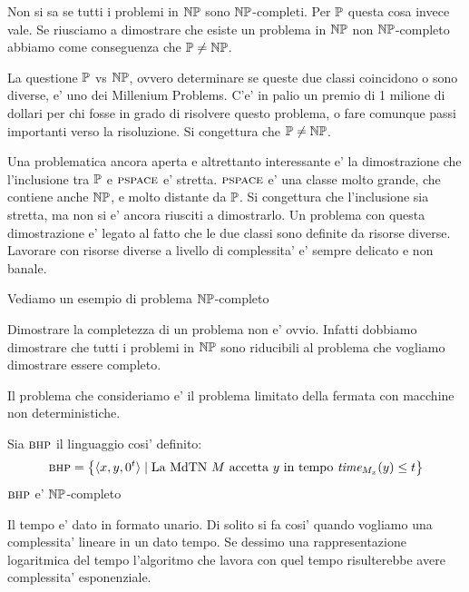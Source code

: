 Non si sa se tutti i problemi in $\mathbb{NP}$ sono $\mathbb{NP}$-completi. Per $\mathbb{P}$ questa cosa
invece vale.  Se riusciamo a dimostrare che esiste un problema in $\mathbb{NP}$ non $\mathbb{NP}$-completo
abbiamo come conseguenza che
$\mathbb{P} \not= \mathbb{NP}$.


La questione $\mathbb{P}$ vs $\mathbb{NP}$, ovvero determinare se queste due classi coincidono o sono
diverse, e' uno dei Millenium Problems. C'e' in palio un premio di 1 milione di dollari per chi
fosse in grado di risolvere questo problema, o fare comunque passi importanti verso la risoluzione.
Si congettura che $\mathbb{P} \not= \mathbb{NP}$.

Una problematica ancora aperta e altrettanto interessante e' la dimostrazione che l'inclusione tra
$\mathbb{P}$ e $\textsc{pspace}$ e' stretta. $\textsc{pspace}$ e' una classe molto grande, che contiene anche
$\mathbb{NP}$, e molto distante da $\mathbb{P}$. Si congettura che l'inclusione sia stretta, ma non si e'
ancora riusciti a dimostrarlo. Un problema con questa dimostrazione e' legato al fatto che le due
classi sono definite da risorse diverse. Lavorare con risorse diverse a livello di complessita' e'
sempre delicato e non banale.


Vediamo un esempio di problema $\mathbb{NP}$-completo

Dimostrare la completezza di un problema non e' ovvio. Infatti dobbiamo dimostrare che tutti i
problemi in $\mathbb{NP}$ sono riducibili al problema che vogliamo dimostrare essere completo.

Il problema che consideriamo e' il problema limitato della fermata con macchine non deterministiche.

\begin{thm}
    Sia $\textsc{bhp}$ il linguaggio cosi' definito:
    \begin{equation*}
        \textsc{bhp} = \left\{\langle x,y,0^{t} \rangle \mid \text{La MdTN $M$ accetta $y$ in tempo
        $\textit{time}_{M_{x}}(y) \leq t$}\right\}
    \end{equation*}
    $\textsc{bhp}$ e' $\mathbb{NP}$-completo
\end{thm}

Il tempo e' dato in formato unario. Di solito si fa cosi' quando vogliamo una complessita' lineare
in un dato tempo.  Se dessimo una rappresentazione logaritmica del tempo l'algoritmo che lavora con
quel tempo risulterebbe avere complessita' esponenziale.


